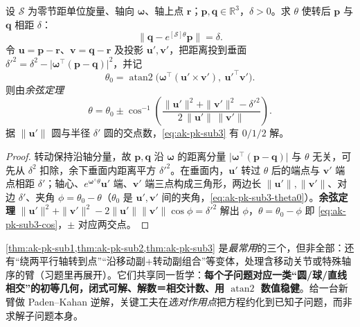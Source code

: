 \begin{theorem}\label{thm:ak-pk-sub3}
设 $\mathcal{S}$ 为零节距单位旋量、轴向 $\boldsymbol{\omega}$、轴上点 $\mathbf{r}$；$\mathbf{p},\mathbf{q}\in\mathbb{R}^3$，$\delta>0$。求 $\theta$ 使转后 $\mathbf{p}$ 与 $\mathbf{q}$ 相距 $\delta$\cite{murray1994mathematical}：
\begin{equation}
\big\|\mathbf{q}-e^{[\mathcal{S}]\theta}\mathbf{p}\big\|=\delta.
\label{eq:ak-pk-sub3}
\end{equation}
令 $\mathbf{u}=\mathbf{p}-\mathbf{r}$、$\mathbf{v}=\mathbf{q}-\mathbf{r}$ 及投影 $\mathbf{u}',\mathbf{v}'$，把距离投到垂面 $\delta'^2=\delta^2-\big|\boldsymbol{\omega}^\top(\mathbf{p}-\mathbf{q})\big|^2$，并记
\begin{equation}
\theta_0=\operatorname{atan2}\!\big(\boldsymbol{\omega}^\top(\mathbf{u}'\times\mathbf{v}'),\ \mathbf{u}'^\top\mathbf{v}'\big).
\label{eq:ak-pk-sub3-theta0}
\end{equation}
则由\emph{余弦定理}
\begin{equation}
\boxed{\ \theta=\theta_0\pm\cos^{-1}\!\left(\frac{\|\mathbf{u}'\|^2+\|\mathbf{v}'\|^2-\delta'^2}{2\,\|\mathbf{u}'\|\,\|\mathbf{v}'\|}\right).\ }
\label{eq:ak-pk-sub3-cos}
\end{equation}
据 $\|\mathbf{u}'\|$ 圆与半径 $\delta'$ 圆的交点数，\cref{eq:ak-pk-sub3} 有 $0/1/2$ 解。
\end{theorem}
\begin{proof}
转动保持沿轴分量，故 $\mathbf{p},\mathbf{q}$ 沿 $\boldsymbol{\omega}$ 的距离分量 $\big|\boldsymbol{\omega}^\top(\mathbf{p}-\mathbf{q})\big|$ 与 $\theta$ 无关，可先从 $\delta^2$ 扣除，余下垂面内距离平方 $\delta'^2$。在垂面内，$\mathbf{u}'$ 转过 $\theta$ 后的端点与 $\mathbf{v}'$ 端点相距 $\delta'$；轴心、$e^{\boldsymbol{\omega}^\wedge\theta}\mathbf{u}'$ 端、$\mathbf{v}'$ 端三点构成三角形，两边长 $\|\mathbf{u}'\|,\|\mathbf{v}'\|$、对边 $\delta'$、夹角 $\phi=\theta_0-\theta$（$\theta_0$ 是 $\mathbf{u}',\mathbf{v}'$ 间的夹角，\cref{eq:ak-pk-sub3-theta0}）。\textbf{余弦定理} $\|\mathbf{u}'\|^2+\|\mathbf{v}'\|^2-2\|\mathbf{u}'\|\|\mathbf{v}'\|\cos\phi=\delta'^2$ 解出 $\phi$，$\theta=\theta_0-\phi$ 即 \cref{eq:ak-pk-sub3-cos}，$\pm$ 对应两交点。
\end{proof}

\begin{note}\label{note:ak-pk-more}
\cref{thm:ak-pk-sub1,thm:ak-pk-sub2,thm:ak-pk-sub3} 是\emph{最常用}的三个，但非全部\cite{murray1994mathematical}：还有“绕两平行轴转到点”“沿移动副+转动副组合”等变体，处理含移动关节或特殊轴序的臂（习题里再展开）。它们共享同一哲学：\textbf{每个子问题对应一类“圆/球/直线相交”的初等几何，闭式可解、解数＝相交计数、用 $\operatorname{atan2}$ 数值稳健}。给一台新臂做 Paden--Kahan 逆解，关键工夫在\emph{选对作用点}把方程约化到已知子问题，而非求解子问题本身。
\end{note}

